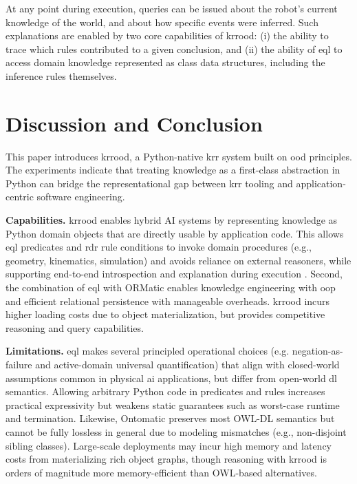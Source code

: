 \documentclass{article}
\newcommand{\todo}[1]{\textcolor{red}{\textbf{TODO: #1}}}
\begin{document}
At any point during execution, queries can be issued about the robot’s current knowledge of the world, and about how specific events were inferred. Such explanations are enabled by two core capabilities of \ac{krrood}: (i) the ability to trace which rules contributed to a given conclusion, and (ii) the ability of \ac{eql} to access domain knowledge represented as class data structures, including the inference rules themselves.

\section{Discussion and Conclusion}
\label{sec:discussion_conclusion}

This paper introduces \ac{krrood}, a Python-native \ac{krr} system built on \ac{ood} principles. The experiments indicate that treating knowledge as a first-class abstraction in Python can bridge the representational gap between \ac{krr} tooling and application-centric software engineering.

\textbf{Capabilities.}
\ac{krrood} enables hybrid AI systems by representing knowledge as Python domain objects that are directly usable by application code. This allows \ac{eql} predicates and \ac{rdr} rule conditions to invoke domain procedures (e.g., geometry, kinematics, simulation) and avoids reliance on external reasoners, while supporting end-to-end introspection and explanation during execution \cite{beetz2025robot,mania2024open,alt2023knowledge,stelter2022open}. Second, the combination of \ac{eql} with ORMatic enables knowledge engineering with \ac{oop} and efficient relational persistence with manageable overheads. \ac{krrood} incurs higher loading costs due to object materialization, but provides competitive reasoning and query capabilities.

\textbf{Limitations.}
\ac{eql} makes several principled operational choices (e.g. negation-as-failure and active-domain universal quantification) that align with closed-world assumptions common in physical \ac{ai} applications, but differ from open-world \ac{dl} semantics. Allowing arbitrary Python code in predicates and rules increases practical expressivity but weakens static guarantees such as worst-case runtime and termination. Likewise, Ontomatic preserves most OWL-DL semantics but cannot be fully lossless in general due to modeling mismatches (e.g., non-disjoint sibling classes). Large-scale deployments may incur high memory and latency costs from materializing rich object graphs, though reasoning with \ac{krrood} is orders of magnitude more memory-efficient than OWL-based alternatives. %
\end{document}
